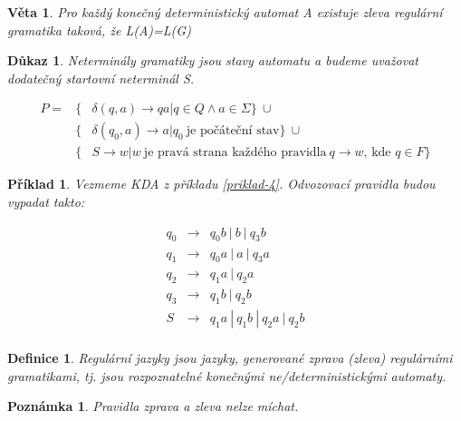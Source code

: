 \documentclass[10pt, a4paper, titlepage]{article}
\theoremstyle{note}
\newtheorem{dukaz}{Důkaz}
\newtheorem{veta}{Věta}
\newtheorem{definice}{Definice}
\newtheorem{priklad}{Příklad}
\newtheorem{poznamka}{Poznámka}
\begin{document}
\begin{veta}
Pro každý konečný deterministický automat \textit{A} existuje zleva regulární gramatika taková, že \textit{L(A)=L(G)}
\end{veta}

\begin{dukaz}
Neterminály gramatiky jsou stavy automatu a budeme uvažovat dodatečný startovní neterminál S.

\begin{eqnarray*}
P = &\lbrace& \delta (q,a) \rightarrow qa | q \in Q \wedge a \in \Sigma \rbrace \ \cup \\
&\lbrace& \delta (q_0,a) \rightarrow a | q_0\ \text{je počáteční stav} \rbrace \ \cup \\
&\lbrace& S \rightarrow w|w \ \text{je pravá strana každého pravidla}\ q \rightarrow w\text{, kde } q \in F \rbrace
\end{eqnarray*}

\end{dukaz}

\begin{priklad}
Vezmeme KDA z příkladu \ref{priklad-4}.
Odvozovací pravidla budou vypadat takto:

\begin{eqnarray*}
q_0 &\rightarrow& q_{0}b\ |\ b\ |\ q_{3}b \\
q_1 &\rightarrow& q_{0}a\ |\ a\ |\ q_{3}a \\
q_2 &\rightarrow& q_{1}a\ |\ q_{2}a \\
q_3 &\rightarrow& q_{1}b\ |\ q_{2}b \\
S &\rightarrow& q_{1}a\ |\ q_{1}b\ |\ q_{2}a\ |\ q_{2}b \\
\end{eqnarray*}

\end{priklad}

\begin{definice}
Regulární jazyky jsou jazyky, generované zprava (zleva) regulárními gramatikami, tj. jsou rozpoznatelné konečnými ne/deterministickými automaty.
\end{definice}

\begin{poznamka}
Pravidla zprava a zleva nelze míchat.
\end{poznamka}
\end{document}
